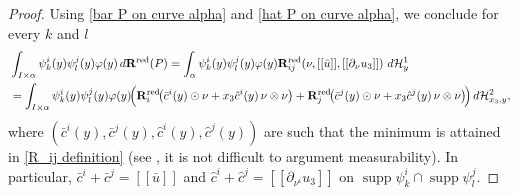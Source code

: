 \documentclass[reqno,10pt]{amsart}
\numberwithin{equation}{section}
\theoremstyle{remark}
\newcommand{\calH}{\mathcal{H}}
\DeclareMathOperator{\supp}{supp}
\newcommand{\disspot}{\mathbf{R}}
\begin{document}
\begin{proof}
Using \eqref{bar P on curve alpha} and \eqref{hat P on curve alpha}, we conclude for every $k$ and $l$
\begin{align*}
	& \int_{I \times \alpha} \psi_k^{i}(y)\psi_l^{j}(y)\varphi(y)\,d\disspot^{\rm red}(P) 
	= \int_{\alpha} \psi_k^{i}(y)\psi_l^{j}(y)\varphi(y) \disspot^{\rm red}_{ij}\!\left(\nu,[[\bar{u}]], [[\partial_{\nu}u_3]]\right) \,d\calH^{1}_{y}
	\\& = \int_{I \times \alpha} \psi_k^{i}(y)\psi_l^{j}(y)\varphi(y) \!\Big( \disspot_i^{\rm red}\!\big(\bar{c}^i(y) \odot \nu + x_3 \hat{c}^i(y)\, \nu \otimes \nu\big) + \disspot_j^{\rm red}\!\big(\bar{c}^j(y) \odot \nu + x_3 \hat{c}^j(y)\, \nu \otimes \nu\big) \!\Big) \,d\calH^{2}_{x_3,y},
\end{align*}
where $(\bar{c}^i(y),\bar{c}^j(y),\hat{c}^i(y),\hat{c}^j(y))$ are such that the minimum is attained in \eqref{R_ij definition} (see , it is not difficult to argument measurability). 
In particular, $\bar{c}^i+\bar{c}^j = [[\bar{u}]]$ and $\hat{c}^i+\hat{c}^j = [[\partial_{\nu^i}u_3]]$ on $\supp\psi_k^{i} \cap \supp\psi_l^{j}$.


\end{proof}
\end{document}
